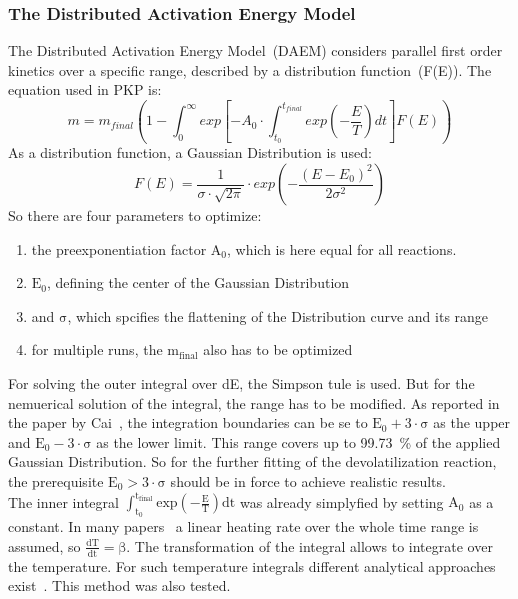 \subsubsection{The Distributed Activation Energy Model}\label{SSS_DAEM}
The Distributed Activation Energy Model~(DAEM) considers parallel first order kinetics over a specific range, described by a distribution function~(F(E)). The equation used in PKP is:
\begin{equation}\label{E_DAEM}
 m = m_{final} \left( 1 - \int_{0}^{\infty} exp\left[ -A_0 \cdot \int^{t_{final}}_{t_0} exp\left( -\frac{E}{T} \right) dt  \right] F(E) \right)
\end{equation}
As a distribution function, a Gaussian Distribution is used:
\begin{equation}\label{E_GaussDistr}
 F(E) = \frac{1}{\sigma \cdot \sqrt{2\pi}} \cdot exp \left( -\frac{(E-E_0)^2}{2\sigma^2} \right)
\end{equation}
So there are four parameters to optimize:\\
\begin{enumerate}
 \item the preexponentiation factor $\mathrm{A_0}$, which is here equal for all reactions.
 \item $\mathrm{E_0}$, defining the center of the Gaussian Distribution
 \item and $\mathrm{\sigma}$, which spcifies the flattening of the Distribution curve and its range
 \item for multiple runs, the $\mathrm{m_{final}}$ also has to be optimized
\end{enumerate}
For solving the outer integral over dE, the Simpson tule is used. But for the nemuerical solution of the integral, the range has to be modified. As reported in the paper by Cai~\cite{Cai_DAEM1}, the integration boundaries can be se to $\mathrm{E_0 + 3 \cdot \sigma}$ as the upper and $\mathrm{E_0 - 3 \cdot \sigma}$ as the lower limit. This range covers up to 99.73~\% of the applied Gaussian Distribution. So for the further fitting of the devolatilization reaction, the prerequisite $\mathrm{E_0 > 3 \cdot \sigma}$ should be in force to achieve realistic results.\\
The inner integral $\mathrm{\int^{t_{final}}_{t_0} exp\left( -\frac{E}{T} \right) dt}$ was already simplyfied by setting $\mathrm{A_0}$ as a constant. In many papers~\cite{Cai_DAEM1,Cai_DAEM2,Cai_DAEM3,Slovak_DAEM} a linear heating rate over the whole time range is assumed, so $\mathrm{\frac{dT}{dt}=\beta}$. The transformation of the integral allows to integrate over the temperature. For such temperature integrals different analytical approaches exist~\cite{Cai_DAEM1,Cai_DAEM2}. This method was also tested.
